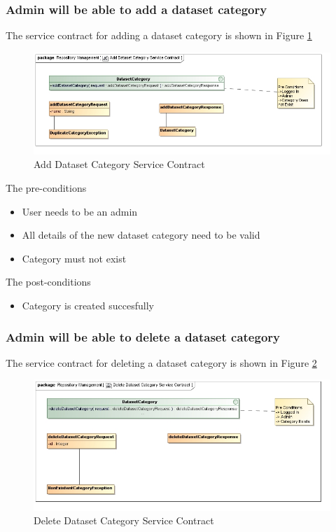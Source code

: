 \subsubsection {Admin will be able to add a dataset category}
The service contract for adding a dataset category is shown in Figure \ref{fig:addDatasetCatService}
\begin{figure}[H]
  \begin{center}
  \includegraphics[scale=0.6]{../Diagrams and Charts/Test Data/Add Dataset Category Service Contract.jpg}
  \caption{Add Dataset Category Service Contract}
  \end{center}
  \label{fig:addDatasetCatService}
\end{figure}

The pre-conditions
\begin{itemize}
  \item User needs to be an admin
  \item All details of the new dataset category need to be valid
  \item Category must not exist
\end{itemize}

The post-conditions
\begin{itemize}
  \item Category is created succesfully
\end{itemize}

\subsubsection {Admin will be able to delete a dataset category}

The service contract for deleting a dataset category is shown in Figure \ref{fig:deleteDatasetCatService}
\begin{figure}[H]
  \begin{center}
  \includegraphics[scale=0.6]{../Diagrams and Charts/Test Data/Delete Dataset Category Service Contract.jpg}
  \caption{Delete Dataset Category Service Contract}
  \end{center}
  \label{fig:deleteDatasetCatService}
\end{figure}

